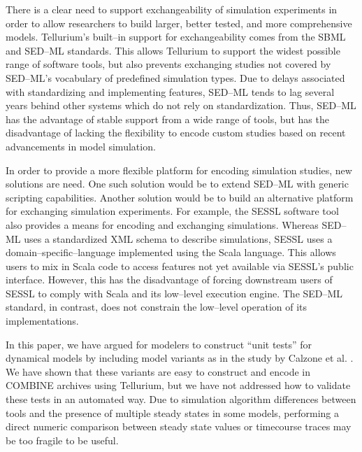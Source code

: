 \documentclass[10pt,letterpaper]{article}
\begin{document}
There is a clear need to support exchangeability of simulation experiments in order to allow researchers to build larger, better tested, and more comprehensive models. Tellurium's built--in support for exchangeability comes from the SBML and SED--ML standards. This allows Tellurium to support the widest possible range of software tools, but also prevents exchanging studies not covered by SED--ML's vocabulary of predefined simulation types. Due to delays associated with standardizing and implementing features, SED--ML tends to lag several years behind other systems which do not rely on standardization. Thus, SED--ML has the advantage of stable support from a wide range of tools, but has the disadvantage of lacking the flexibility to encode custom studies based on recent advancements in model simulation.

In order to provide a more flexible platform for encoding simulation studies, new solutions are need. One such solution would be to extend SED--ML with generic scripting capabilities. Another solution would be to build an alternative platform for exchanging simulation experiments. For example, the SESSL \cite{ewald2014sessl} software tool also provides a means for encoding and exchanging simulations. Whereas SED--ML uses a standardized XML schema to describe simulations, SESSL uses a domain--specific--language implemented using the Scala language. This allows users to mix in Scala code to access features not yet available via SESSL's public interface. However, this has the disadvantage of forcing downstream users of SESSL to comply with Scala and its low--level execution engine. The SED--ML standard, in contrast, does not constrain the low--level operation of its implementations.

In this paper, we have argued for modelers to construct ``unit tests'' for dynamical models by including model variants as in the study by Calzone et al. \cite{calzone2007dynamical}. We have shown that these variants are easy to construct and encode in COMBINE archives using Tellurium, but we have not addressed how to validate these tests in an automated way. Due to simulation algorithm differences between tools and the presence of multiple steady states in some models, performing a direct numeric comparison between steady state values or timecourse traces may be too fragile to be useful.
\end{document}

